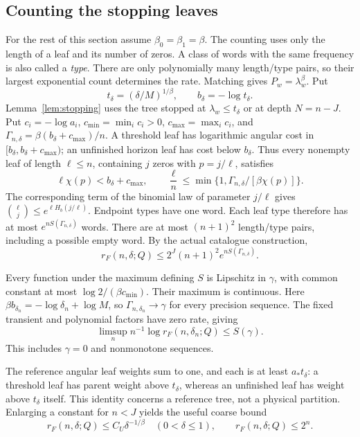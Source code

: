 \documentclass[11pt]{amsart}
\theoremstyle{definition}
\theoremstyle{remark}
\numberwithin{equation}{section}
\begin{document}
\subsection{Counting the stopping leaves}
For the rest of this section assume $\beta_0=\beta_1=\beta$.
The counting uses only the length of a leaf and its number of zeros.
A class of words with the same frequency is also called a
\emph{type}. There are only polynomially many length/type pairs,
so their largest exponential count determines the rate.
Matching gives $P_w=\lambda_w^\beta$. Put
\[
t_\delta=(\delta/M)^{1/\beta},\qquad b_\delta=-\log t_\delta.
\]
Lemma~\ref{lem:stopping} uses the tree stopped at
$\lambda_w\le t_\delta$ or at depth $N=n-J$.
Put $c_i=-\log a_i$, $c_{\min}=\min_i c_i>0$,
$c_{\max}=\max_i c_i$, and
$\Gamma_{n,\delta}=\beta(b_\delta+c_{\max})/n$.
A threshold leaf has logarithmic angular cost in
$[b_\delta,b_\delta+c_{\max})$; an unfinished horizon leaf
has cost below $b_\delta$. Thus every nonempty leaf of length
$\ell\le n$, containing $j$ zeros with $p=j/\ell$, satisfies
\begin{equation}\label{eq:leafcost}
\ell\chi(p)<b_\delta+c_{\max},\qquad
\frac{\ell}{n}\le
       \min\{1,\Gamma_{n,\delta}/[\beta\chi(p)]\}.
\end{equation}
The corresponding term of the binomial law of parameter $j/\ell$
gives $\binom{\ell}{j}\le e^{\ell H_b(j/\ell)}$.
Endpoint types have one word. Each leaf type therefore has at most
$e^{nS(\Gamma_{n,\delta})}$ words. There are at most $(n+1)^2$
length/type pairs, including a possible empty word. By the actual
catalogue construction,
\begin{equation}\label{eq:treeupper}
r_F(n,\delta;Q)\le 2^J(n+1)^2e^{nS(\Gamma_{n,\delta})}.
\end{equation}

Every function under the maximum defining $S$ is Lipschitz in
$\gamma$, with common constant at most
$\log2/(\beta c_{\min})$. Their maximum is continuous.
Here $\beta b_{\delta_n}=-\log\delta_n+\log M$, so
$\Gamma_{n,\delta_n}\to\gamma$ for every precision sequence.
The fixed transient and polynomial factors have zero rate, giving
\begin{equation}\label{eq:spectrumupper}
\limsup_n n^{-1}\log r_F(n,\delta_n;Q)\le S(\gamma).
\end{equation}
This includes $\gamma=0$ and nonmonotone sequences.

The reference angular leaf weights sum to one, and each is at least
$a_*t_\delta$: a threshold leaf has parent weight above $t_\delta$,
whereas an unfinished leaf has weight above $t_\delta$ itself.
This identity concerns a reference tree, not a physical partition.
Enlarging a constant for $n<J$ yields the useful coarse bound
\begin{equation}\label{eq:upper}
r_F(n,\delta;Q)\le C_U\delta^{-1/\beta}
       \quad(0<\delta\le1),\qquad r_F(n,\delta;Q)\le2^n .
\end{equation}
\end{document}

